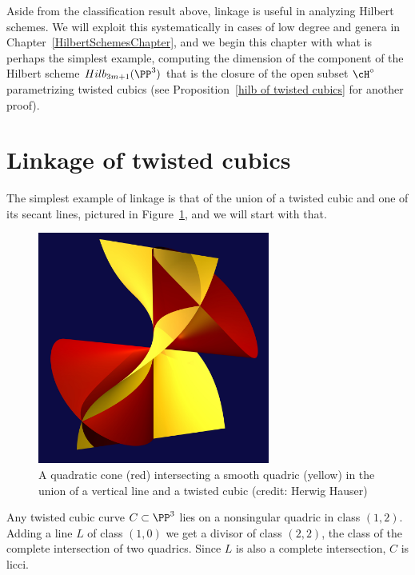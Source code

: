 Aside from the classification result above, linkage is useful in analyzing Hilbert schemes. We will exploit this systematically in cases of low degree and genera in Chapter~\ref{HilbertSchemesChapter}, and we begin
this chapter with what is perhaps the simplest example, computing the dimension of the component of
the Hilbert scheme $Hilb_{3m+1}(\PP^3)$ that is the closure of the open subset $\cH^\circ$  parametrizing twisted cubics (see Proposition~\ref{hilb of twisted cubics} for another proof).

\section{Linkage of twisted cubics}
The simplest example of linkage is that of the union of a twisted cubic and one of its secant lines, pictured in
Figure~\ref{cubicAndLine}, and we will start with that.

\begin{figure}\label{cubicAndLine}
\centerline {\includegraphics[height=3in]{"main/Fig15-1-TwistAndShout"}}
 \caption{A quadratic cone (red) intersecting a smooth quadric (yellow) in the union of a vertical line and a twisted cubic (credit: Herwig Hauser)}
\end{figure}

Any twisted cubic curve $C\subset \PP^{3}$ lies on a nonsingular quadric in class $(1,2)$. Adding a line $L$ of class
$(1,0)$ we get a  divisor of class $(2,2)$, the class of the complete intersection of two quadrics. Since $L$ is also 
a complete intersection, $C$ is licci.

